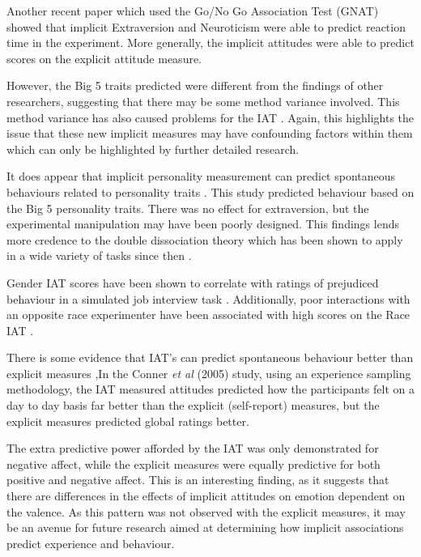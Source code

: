 Another recent paper \cite{Boldero2007} which used the Go/No Go Association Test (GNAT) showed that implicit Extraversion and Neuroticism were able to predict reaction time in the experiment. More generally, the implicit attitudes were able to predict scores on the explicit attitude measure. 

However, the Big 5 traits predicted were different from the findings of other researchers, suggesting that there may be some method variance involved. This method variance has also caused problems for the IAT \cite{Mierke2003,Greenwald2003a}. Again, this highlights the issue that these new implicit measures may have confounding factors within them which can only be highlighted by further detailed research.

It does appear that implicit personality measurement can predict spontaneous behaviours related to  personality traits \cite{Steffens2006}. This study predicted behaviour based on the Big 5 personality traits. There was no effect for extraversion, but the experimental manipulation may have been poorly designed. This findings lends more credence to the double dissociation theory \cite{Asendorpf2002} which has been shown to apply in a wide variety of tasks since then \cite{Perugini2005,Conner2005}. 


Gender IAT scores have been shown to correlate with ratings of prejudiced behaviour in a simulated job interview task \cite{Rudman1999a}. Additionally, poor interactions with an opposite race experimenter have been associated with high scores on the Race IAT \cite{McConnell2001}. 

There is some evidence that IAT's can predict spontaneous behaviour better than explicit measures \cite{Conner2005,Perugini2005,Grumm2007} ,In the Conner \textit{et al} (2005) study, using an experience sampling methodology, the IAT measured attitudes predicted how the participants felt on a day to day basis far better than the explicit (self-report) measures, but the explicit measures predicted global ratings better. 

The extra predictive power afforded by the IAT  was only demonstrated for negative affect,  while the explicit measures were equally predictive for both positive and negative affect.  This is an interesting finding, as it suggests that there are differences in the effects of implicit attitudes on emotion dependent on the valence. As this pattern was not observed with the explicit measures, it may be an avenue for future research aimed at determining how implicit associations predict experience and behaviour. 


